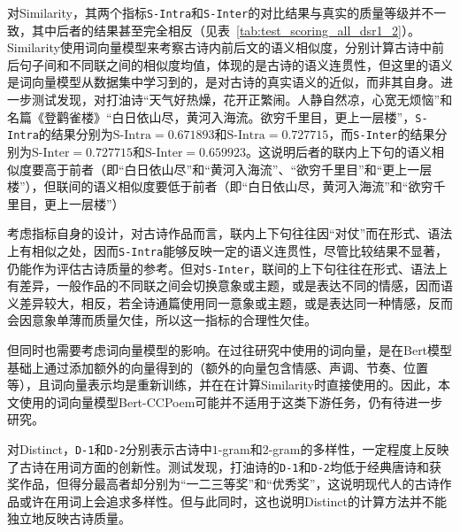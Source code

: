 对Similarity，其两个指标\verb|S-Intra|和\verb|S-Inter|的对比结果与真实的质量等级并不一致，其中后者的结果甚至完全相反（见表~\ref{tab:test_scoring_all_dsr1_2}）。Similarity使用词向量模型来考察古诗内前后文的语义相似度，分别计算古诗中前后句子间和不同联之间的相似度均值，体现的是古诗的语义连贯性，但这里的语义是词向量模型从数据集中学习到的，是对古诗的真实语义的近似，而非其自身。进一步测试发现，对打油诗“{\kaishu 天气好热燥，花开正繁闹。人静自然凉，心宽无烦恼}”和名篇《登鹳雀楼》“{\kaishu 白日依山尽，黄河入海流。欲穷千里目，更上一层楼}”，\verb|S-Intra|的结果分别为$\text{S-Intra}=0.671893$和$\text{S-Intra}=0.727715$，而\verb|S-Inter|的结果分别为$\text{S-Inter}=0.727715$和$\text{S-Inter}=0.659923$。这说明后者的联内上下句的语义相似度要高于前者（即“{\kaishu 白日依山尽}”和“{\kaishu 黄河入海流}”、“{\kaishu 欲穷千里目}”和“{\kaishu 更上一层楼}”），但联间的语义相似度要低于前者（即“{\kaishu 白日依山尽，黄河入海流}”和“{\kaishu 欲穷千里目，更上一层楼}”）

考虑指标自身的设计，对古诗作品而言，联内上下句往往因“对仗”而在形式、语法上有相似之处，因而\verb|S-Intra|能够反映一定的语义连贯性，尽管比较结果不显著，仍能作为评估古诗质量的参考。但对\verb|S-Inter|，联间的上下句往往在形式、语法上有差异，一般作品的不同联之间会切换意象或主题，或是表达不同的情感，因而语义差异较大，相反，若全诗通篇使用同一意象或主题，或是表达同一种情感，反而会因意象单薄而质量欠佳，所以这一指标的合理性欠佳。

但同时也需要考虑词向量模型的影响。在过往研究中使用的词向量，是在Bert模型基础上通过添加额外的向量得到的（额外的向量包含情感、声调、节奏、位置等），且词向量表示均是重新训练，并在在计算Similarity时直接使用的。因此，本文使用的词向量模型Bert-CCPoem可能并不适用于这类下游任务，仍有待进一步研究。


对Distinct，\verb|D-1|和\verb|D-2|分别表示古诗中$1$-gram和$2$-gram的多样性，一定程度上反映了古诗在用词方面的创新性。测试发现，打油诗的\verb|D-1|和\verb|D-2|均低于经典唐诗和获奖作品，但得分最高者却分别为“一二三等奖”和“优秀奖”，这说明现代人的古诗作品或许在用词上会追求多样性。但与此同时，这也说明Distinct的计算方法并不能独立地反映古诗质量。

